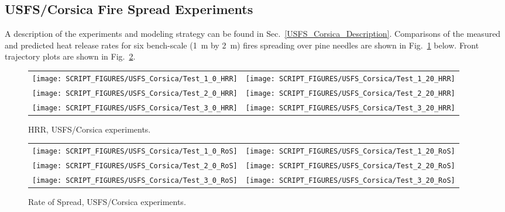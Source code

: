 \clearpage

\subsection{USFS/Corsica Fire Spread Experiments}
\label{USFS_Corsica_Results}

A description of the experiments and modeling strategy can be found in Sec.~\ref{USFS_Corsica_Description}. Comparisons of the measured and predicted heat release rates for six bench-scale (1~m by 2~m) fires spreading over pine needles are shown in Fig.~\ref{USFS_Corsica_HRR} below. Front trajectory plots are shown in Fig.~\ref{USFS_Corsica_RoS}.

\begin{figure}[!ht]
\begin{tabular*}{\textwidth}{l@{\extracolsep{\fill}}r}
\texttt{[image: SCRIPT\_FIGURES/USFS\_Corsica/Test\_1\_0\_HRR]} &
\texttt{[image: SCRIPT\_FIGURES/USFS\_Corsica/Test\_1\_20\_HRR]} \\
\texttt{[image: SCRIPT\_FIGURES/USFS\_Corsica/Test\_2\_0\_HRR]} &
\texttt{[image: SCRIPT\_FIGURES/USFS\_Corsica/Test\_2\_20\_HRR]} \\
\texttt{[image: SCRIPT\_FIGURES/USFS\_Corsica/Test\_3\_0\_HRR]} &
\texttt{[image: SCRIPT\_FIGURES/USFS\_Corsica/Test\_3\_20\_HRR]}
\end{tabular*}
\caption[HRR, USFS/Corsica experiments]{HRR, USFS/Corsica experiments.}
\label{USFS_Corsica_HRR}
\end{figure}

\begin{figure}[p]
\begin{tabular*}{\textwidth}{l@{\extracolsep{\fill}}r}
\texttt{[image: SCRIPT\_FIGURES/USFS\_Corsica/Test\_1\_0\_RoS]} &
\texttt{[image: SCRIPT\_FIGURES/USFS\_Corsica/Test\_1\_20\_RoS]} \\
\texttt{[image: SCRIPT\_FIGURES/USFS\_Corsica/Test\_2\_0\_RoS]} &
\texttt{[image: SCRIPT\_FIGURES/USFS\_Corsica/Test\_2\_20\_RoS]} \\
\texttt{[image: SCRIPT\_FIGURES/USFS\_Corsica/Test\_3\_0\_RoS]} &
\texttt{[image: SCRIPT\_FIGURES/USFS\_Corsica/Test\_3\_20\_RoS]}
\end{tabular*}
\caption[Rate of Spread, USFS/Corsica experiments]{Rate of Spread, USFS/Corsica experiments.}
\label{USFS_Corsica_RoS}
\end{figure}




